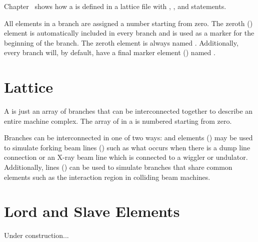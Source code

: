 Chapter~ shows how a  is defined in a
lattice file with , , and  statements.

All elements in a branch are assigned a number starting from zero. The
zeroth  () element is automatically
included in every branch and is used as a marker for the beginning of
the branch.  The zeroth element is always named .
Additionally, every branch will, by default, have a final marker
element () named .

\section{Lattice}
\label{s:lattice.def}

 A  is just an array of branches that
can be interconnected together to describe an entire machine complex.
The array of  in a  is numbered starting from
zero.

Branches can be interconnected in one of two ways:  and
 elements () may be used to simulate
forking beam lines () such as what occurs when there
is a dump line connection or an X-ray beam line which is connected to
a wiggler or undulator. Additionally,  lines
() can be used to simulate branches that share
common elements such as the interaction region in colliding beam
machines.

\section{Lord and Slave Elements}
\label{s:lattice}

Under construction...




